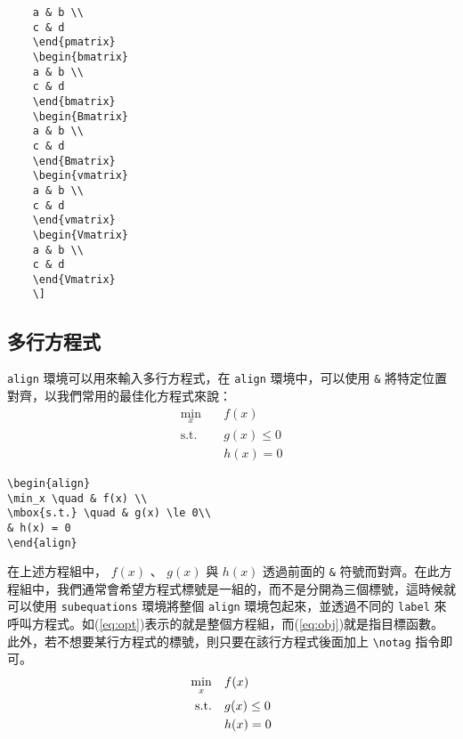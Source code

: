 \documentclass[12pt,a4paper]{report}
\begin{document}
\begin{CJK}{UTF8}{bkai}
\begin{framed}
\begin{verbatim}
	a & b \\
	c & d
	\end{pmatrix}
	\begin{bmatrix}
	a & b \\
	c & d
	\end{bmatrix}
	\begin{Bmatrix}
	a & b \\
	c & d
	\end{Bmatrix}
	\begin{vmatrix}
	a & b \\
	c & d
	\end{vmatrix}
	\begin{Vmatrix}
	a & b \\
	c & d
	\end{Vmatrix}
	\]
	\end{verbatim}
	\end{framed}
	
\subsection{多行方程式}
 \verb|align| 環境可以用來輸入多行方程式，在 \verb|align| 環境中，可以使用 \verb|&| 將特定位置對齊，以我們常用的最佳化方程式來說：
\begin{align}
\min_x \quad & f(x) \\
\mbox{s.t.} \quad & g(x) \le 0\\
& h(x) = 0 
\end{align}
\begin{framed}
\begin{verbatim}
\begin{align}
\min_x \quad & f(x) \\
\mbox{s.t.} \quad & g(x) \le 0\\
& h(x) = 0 
\end{align}
\end{verbatim}
\end{framed}

在上述方程組中， $f(x)$ 、 $g(x)$ 與 $h(x)$ 透過前面的 \verb|&| 符號而對齊。在此方程組中，我們通常會希望方程式標號是一組的，而不是分開為三個標號，這時候就可以使用 \verb|subequations| 環境將整個 \verb|align| 環境包起來，並透過不同的 \verb|label| 來呼叫方程式。如(\ref{eq:opt})表示的就是整個方程組，而(\ref{eq:obj})就是指目標函數。此外，若不想要某行方程式的標號，則只要在該行方程式後面加上 \verb|\notag| 指令即可。\begin{subequations}
\begin{align}
\min_x \quad & f(x) \label{eq:obj}\\
\mbox{s.t.} \quad & g(x) \le 0 \notag\\
& h(x) = 0 
\end{align}
\label{eq:opt}
\end{subequations}


\end{CJK}
\end{document}
